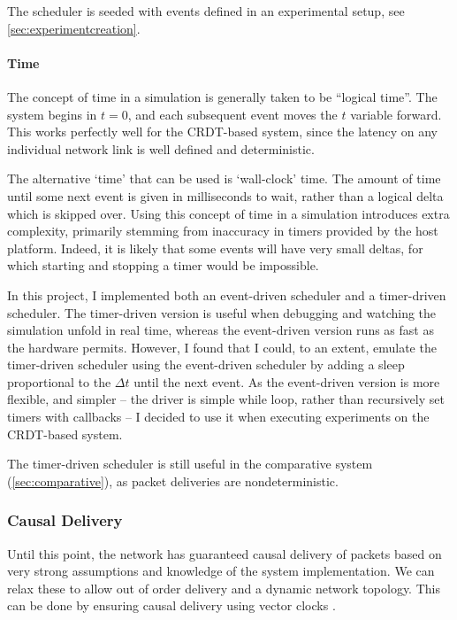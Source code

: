 \documentclass[12pt,a4paper,twoside,openright]{report}
\begin{document}
		The scheduler is seeded with events defined in an experimental setup, see \cref{sec:experimentcreation}.
		
		\paragraph{Time}
		The concept of time in a simulation is generally taken to be ``logical time''. The system begins in $t = 0$, and each subsequent event moves the $t$ variable forward. This works perfectly well for the CRDT-based system, since the latency on any individual network link is well defined and deterministic.
		
		The alternative `time' that can be used is `wall-clock' time. The amount of time until some next event is given in milliseconds to wait, rather than a logical delta which is skipped over. Using this concept of time in a simulation introduces extra complexity, primarily stemming from inaccuracy in timers provided by the host platform. Indeed, it is likely that some events will have very small deltas, for which starting and stopping a timer would be impossible. 
		
		In this project, I implemented both an event-driven scheduler and a timer-driven scheduler. The timer-driven version is useful when debugging and watching the simulation unfold in real time, whereas the event-driven version runs as fast as the hardware permits. However, I found that I could, to an extent, emulate the timer-driven scheduler using the event-driven scheduler by adding a sleep proportional to the $\Delta t$ until the next event. As the event-driven version is more flexible, and simpler -- the driver is simple while loop, rather than recursively set timers with callbacks -- I decided to use it when executing experiments on the CRDT-based system.
		
		The timer-driven scheduler is still useful in the comparative system (\cref{sec:comparative}), as packet deliveries are nondeterministic.
		
		
		\subsubsection{Causal Delivery}
		Until this point, the network has guaranteed causal delivery of packets based on very strong assumptions and knowledge of the system implementation. We can relax these to allow out of order delivery and a dynamic network topology. This can be done by ensuring causal delivery using vector clocks \cite{fidge1987}.
		
\end{document}
